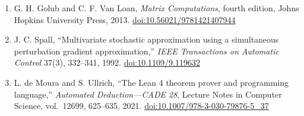 \documentclass[
  11pt,
]{article}
\providecommand{\tightlist}{%
  \setlength{\itemsep}{0pt}\setlength{\parskip}{0pt}}
\theoremstyle{plain}
\theoremstyle{definition}\newtheorem{definition}[theorem]{Definition}
\theoremstyle{remark}\newtheorem*{remark}{Remark}
\begin{document}
\begin{enumerate}
\def\labelenumi{\arabic{enumi}.}
\tightlist
\item
  G. H. Golub and C. F. Van Loan, \emph{Matrix Computations}, fourth edition,
  Johns Hopkins University Press, 2013.
  \href{https://doi.org/10.56021/9781421407944}{doi:10.56021/9781421407944}
\item
  J. C. Spall, ``Multivariate stochastic approximation using a simultaneous
  perturbation gradient approximation,'' \emph{IEEE Transactions on Automatic
  Control} 37(3), 332--341, 1992.
  \href{https://doi.org/10.1109/9.119632}{doi:10.1109/9.119632}
\item
  L. de Moura and S. Ullrich, ``The Lean 4 theorem prover and programming
  language,'' \emph{Automated Deduction---CADE 28}, Lecture Notes in Computer Science,
  vol.~12699, 625--635, 2021.
  \href{https://doi.org/10.1007/978-3-030-79876-5_37}{doi:10.1007/978-3-030-79876-5\_37}
\end{enumerate}
\end{document}
